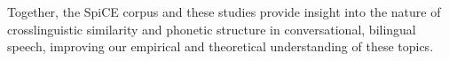 Together, the SpiCE corpus and these studies provide insight into the nature of crosslinguistic similarity and phonetic structure in conversational, bilingual speech, improving our empirical and theoretical understanding of these topics.

\endinput %

